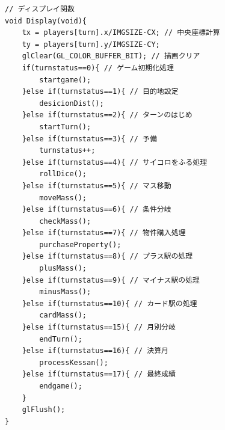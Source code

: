 \documentclass[a4j]{jarticle}
\begin{document}
\begin{lstlisting}[basicstyle=\ttfamily\footnotesize, frame=single,label=code2,caption=game.c]
// ディスプレイ関数
void Display(void){
    tx = players[turn].x/IMGSIZE-CX; // 中央座標計算
    ty = players[turn].y/IMGSIZE-CY;
    glClear(GL_COLOR_BUFFER_BIT); // 描画クリア
    if(turnstatus==0){ // ゲーム初期化処理
        startgame();
    }else if(turnstatus==1){ // 目的地設定
        desicionDist();
    }else if(turnstatus==2){ // ターンのはじめ
        startTurn();
    }else if(turnstatus==3){ // 予備
        turnstatus++;
    }else if(turnstatus==4){ // サイコロをふる処理
        rollDice();
    }else if(turnstatus==5){ // マス移動
        moveMass();
    }else if(turnstatus==6){ // 条件分岐
        checkMass();
    }else if(turnstatus==7){ // 物件購入処理
        purchaseProperty();
    }else if(turnstatus==8){ // プラス駅の処理
        plusMass();
    }else if(turnstatus==9){ // マイナス駅の処理
        minusMass();
    }else if(turnstatus==10){ // カード駅の処理
        cardMass();
    }else if(turnstatus==15){ // 月別分岐
        endTurn();
    }else if(turnstatus==16){ // 決算月
        processKessan();
    }else if(turnstatus==17){ // 最終成績
        endgame();
    }
    glFlush();
}
    \end{lstlisting}
\end{document}
